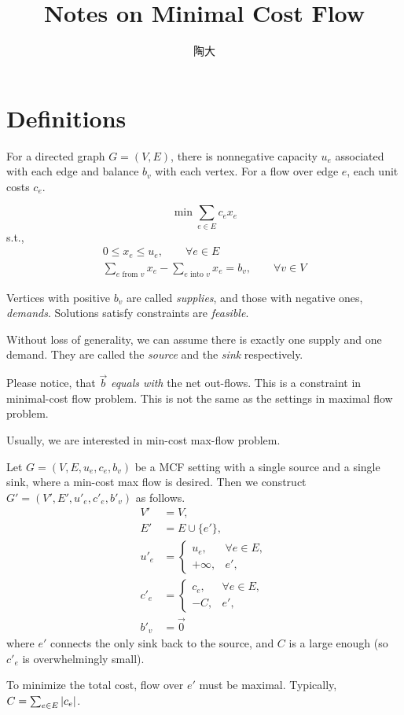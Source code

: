 \documentclass[UTF8,a4paper]{ctexart}
\title{Notes on Minimal Cost Flow}
\author{陶大}
\begin{document}
\maketitle
\tableofcontents

\section{Definitions}

For a directed graph $G=(V, E)$, there is nonnegative capacity $u_e$ associated with each edge
and balance $b_v$ with each vertex.
For a flow over edge $e$, each unit costs $c_e$.

\[
    \min \sum_{e\in E} c_e x_e
\]
s.t.,
\begin{align}
    0\leqslant x_e \leqslant u_e,\qquad \forall e\in E\\
    \sum_{e\text{ from }v} x_e - \sum_{e\text{ into }v} x_e = b_v,\qquad \forall v\in V
\end{align}

Vertices with positive $b_v$ are called \emph{supplies},
and those with negative ones, \emph{demands}.
Solutions satisfy constraints are \emph{feasible}.

Without loss of generality, we can assume there is exactly one supply and one demand.
They are called the \emph{source} and the \emph{sink} respectively.

\begin{remark}
    Please notice, that $\vec{b}$ \emph{equals with} the net out-flows.
    This is a constraint in minimal-cost flow problem.
    This is not the same as the settings in maximal flow problem.
\end{remark}

\begin{remark}
    Usually, we are interested in min-cost max-flow problem.

    Let $G=(V, E, {u_e}, {c_e}, {b_v})$ be a MCF setting with a single source and a single sink,
    where a min-cost max flow is desired.
    Then we construct $G'=(V', E', {u'_e}, {c'_e}, {b'_v})$ as follows.
    \begin{align}
        V'&=V,\\
        E'&=E\cup\{e'\},\\
        u'_e&=\begin{cases}
            u_e,&\forall e\in E,\\
            +\infty,&e',
        \end{cases}\\
        c'_e&=\begin{cases}
            c_e,&\forall e\in E,\\
            -C,&e',
        \end{cases}\\
        b'_v&=\vec{0}
    \end{align}
    where $e'$ connects the only sink back to the source,
    and $C$ is a large enough (so $c'_e$ is overwhelmingly small).

    To minimize the total cost, flow over $e'$ must be maximal.
    Typically, $C=\sum_{e\in E}\left| c_e \right|$.
\end{remark}
\end{document}
